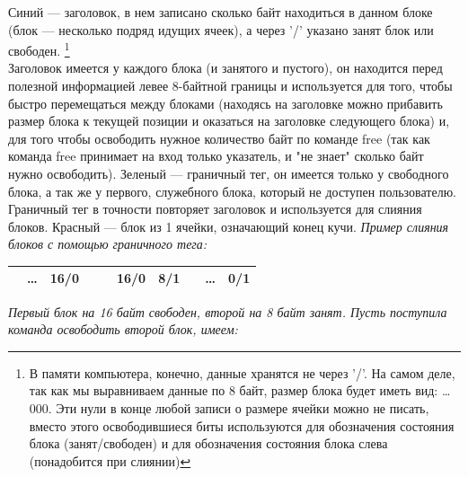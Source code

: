\documentclass[12pt, letterpaper]{article}
\begin{document}
\color{blue} Синий \color{black} — заголовок, в нем записано сколько байт находиться в данном блоке (блок — несколько подряд идущих ячеек), а через '/' указано занят блок или свободен. \footnote{В памяти компьютера, конечно, данные хранятся не через '/'. На самом деле, так как мы выравниваем данные по 8 байт, размер блока будет иметь вид: \dots000. Эти нули в конце любой записи о размере ячейки можно не писать, вместо этого освободившиеся биты используются для обозначения состояния блока (занят/свободен) и для обозначения состояния блока слева (понадобится при слиянии)}\\Заголовок имеется у каждого блока (и занятого и пустого), он находится перед полезной информацией левее 8-байтной границы и используется для того, чтобы быстро перемещаться между блоками (находясь на заголовке можно прибавить размер блока к текущей позиции и оказаться на заголовке следующего блока) и, для того чтобы освободить нужное количество байт по команде free (так как команда free принимает на вход только указатель, и "не знает" сколько байт нужно освободить).
\newline
\color{green} Зеленый \color{black} — граничный тег, он имеется только у свободного блока, а так же у первого, служебного блока, который не доступен пользователю. Граничный тег в точности повторяет заголовок и используется для слияния блоков. 
\newline
\color{red} Красный \color{black} — блок из 1 ячейки, означающий конец кучи.
\newline
\newline
\textit{Пример слияния блоков с помощью граничного тега:}

\begin{center}
    \begin{tabular}{|c|c|c|c|c|c|c|c|c|c|}
        \hline
          & \dots & 16/0 & & & 16/0 & \cellcolor[gray]{0.9} 8/1 & \cellcolor[gray]{0.9} & \dots & 0/1\\
        \hline
    \end{tabular}
\end{center}
\textit{Первый блок на 16 байт свободен, второй на 8 байт занят. Пусть поступила команда освободить второй блок, имеем:}
\end{document}

